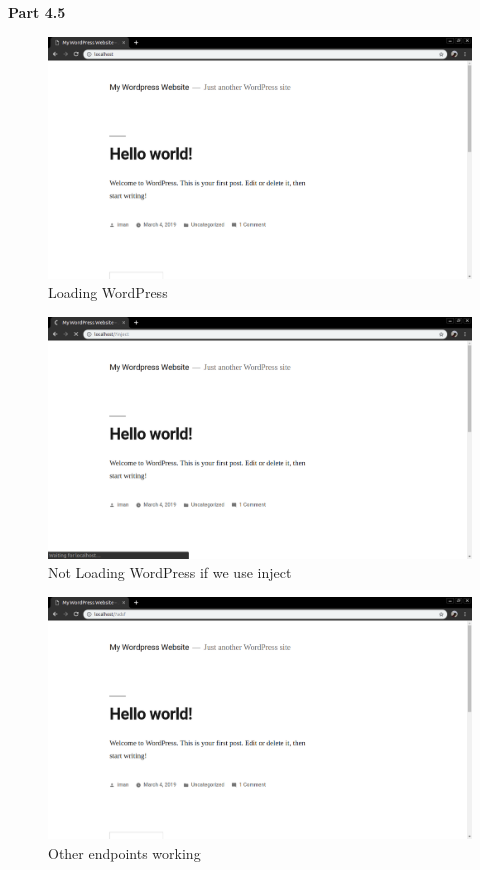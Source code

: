 \documentclass[12pt]{article}
\begin{document}
\textbf{Part 4.5}

\vspace{2mm} 


\begin{figure}[h]
	\centering
	\includegraphics[scale=0.3]{working}
	\caption{Loading WordPress}
\end{figure}

\begin{figure}[h]
	\centering
	\includegraphics[scale=0.3]{not-loading}
	\caption{Not Loading WordPress if we use inject}
\end{figure}

\begin{figure}[h]
	\centering
	\includegraphics[scale=0.3]{other-endpoint-working}
	\caption{Other endpoints working}
\end{figure}
\end{document}
